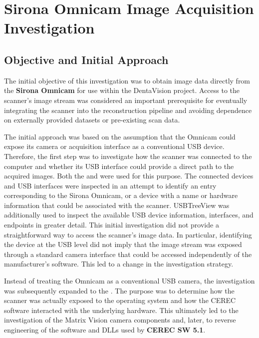 \section{Sirona Omnicam Image Acquisition Investigation}

\subsection{Objective and Initial Approach}

The initial objective of this investigation was to obtain image data directly from the \textbf{Sirona Omnicam} for use within the DentaVision project. Access to the scanner's image stream was considered an important prerequisite for eventually integrating the scanner into the reconstruction pipeline and avoiding dependence on externally provided datasets or pre-existing scan data.

The initial approach was based on the assumption that the Omnicam could expose its camera or acquisition interface as a conventional USB device. Therefore, the first step was to investigate how the scanner was connected to the computer and whether its USB interface could provide a direct path to the acquired images. Both the  and  were used for this purpose. The connected devices and USB interfaces were inspected in an attempt to identify an entry corresponding to the Sirona Omnicam, or a device with a name or hardware information that could be associated with the scanner. USBTreeView was additionally used to inspect the available USB device information, interfaces, and endpoints in greater detail. This initial investigation did not provide a straightforward way to access the scanner's image data. In particular, identifying the device at the USB level did not imply that the image stream was exposed through a standard camera interface that could be accessed independently of the manufacturer's software. This led to a change in the investigation strategy.

Instead of treating the Omnicam as a conventional USB camera, the investigation was subsequently expanded to the . The purpose was to determine how the scanner was actually exposed to the operating system and how the CEREC software interacted with the underlying hardware. This ultimately led to the investigation of the Matrix Vision camera components and, later, to reverse engineering of the software and DLLs used by \textbf{CEREC SW 5.1}.

